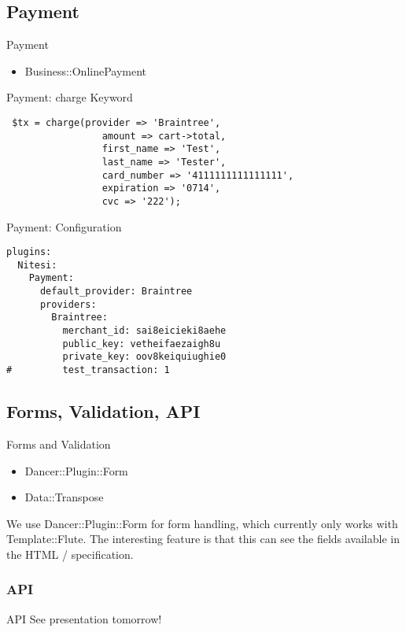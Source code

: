 \subsection{Payment}

\begin{frame}{Payment}
\begin{itemize}
\item Business::OnlinePayment
\end{itemize}
\end{frame}

\begin{frame}[fragile]{Payment: charge Keyword}
\begin{lstlisting}
 $tx = charge(provider => 'Braintree',
                 amount => cart->total,
                 first_name => 'Test',
                 last_name => 'Tester',
                 card_number => '4111111111111111',
                 expiration => '0714',
                 cvc => '222');
\end{lstlisting}
\end{frame}

\begin{frame}[fragile]{Payment: Configuration}
\begin{lstlisting}
plugins:
  Nitesi:
    Payment:
      default_provider: Braintree
      providers:
        Braintree:
          merchant_id: sai8eicieki8aehe 
          public_key: vetheifaezaigh8u 
          private_key: oov8keiquiughie0
#         test_transaction: 1
\end{lstlisting}
\end{frame}

\subsection{Forms, Validation, API}
\begin{frame}{Forms and Validation}
\begin{itemize}
\item Dancer::Plugin::Form
\item Data::Transpose
\end{itemize}
\end{frame}

We use Dancer::Plugin::Form for form handling, which currently
only works with Template::Flute. The interesting feature is
that this can see the fields available in the HTML / specification.

\subsubsection{API}
\begin{frame}{API}
See presentation tomorrow!
\end{frame}

